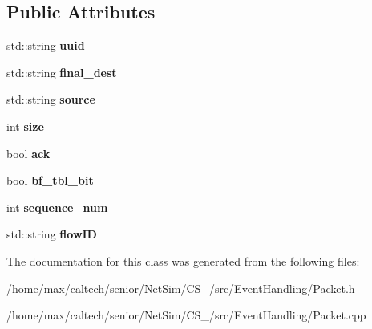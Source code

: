 \subsection*{\-Public \-Attributes}
\begin{DoxyCompactItemize}
\item 
\hypertarget{classPacket_acaefdb9f910265a1ff97b522a780f088}{std\-::string {\bfseries uuid}}\label{classPacket_acaefdb9f910265a1ff97b522a780f088}

\item 
\hypertarget{classPacket_a14d18bd9829ec1951730bc8bbadb570d}{std\-::string {\bfseries final\-\_\-dest}}\label{classPacket_a14d18bd9829ec1951730bc8bbadb570d}

\item 
\hypertarget{classPacket_a9fdc30310ed4a548f4a51dc6c79442d9}{std\-::string {\bfseries source}}\label{classPacket_a9fdc30310ed4a548f4a51dc6c79442d9}

\item 
\hypertarget{classPacket_ad6c10fc808850949cd3f9b9a2ff018d5}{int {\bfseries size}}\label{classPacket_ad6c10fc808850949cd3f9b9a2ff018d5}

\item 
\hypertarget{classPacket_a1824b08ed28de1f329146d082b6d0dee}{bool {\bfseries ack}}\label{classPacket_a1824b08ed28de1f329146d082b6d0dee}

\item 
\hypertarget{classPacket_ab3bb221061fb274a23f041e4b5e93ce7}{bool {\bfseries bf\-\_\-tbl\-\_\-bit}}\label{classPacket_ab3bb221061fb274a23f041e4b5e93ce7}

\item 
\hypertarget{classPacket_a1dcc152b6caa339c9d6f86c0fcde1c52}{int {\bfseries sequence\-\_\-num}}\label{classPacket_a1dcc152b6caa339c9d6f86c0fcde1c52}

\item 
\hypertarget{classPacket_ad841c025e14798586e5a01dfb17a8e56}{std\-::string {\bfseries flow\-I\-D}}\label{classPacket_ad841c025e14798586e5a01dfb17a8e56}

\end{DoxyCompactItemize}


\-The documentation for this class was generated from the following files\-:\begin{DoxyCompactItemize}
\item 
/home/max/caltech/senior/\-Net\-Sim/\-C\-S\-\_/src/\-Event\-Handling/\-Packet.\-h\item 
/home/max/caltech/senior/\-Net\-Sim/\-C\-S\-\_/src/\-Event\-Handling/\-Packet.\-cpp\end{DoxyCompactItemize}
